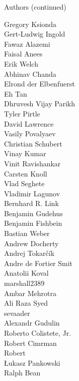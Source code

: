 \documentclass[xcolor=svgnames]{beamer}
\begin{document}
\begin{frame}{Authors (continued)}
  \begin{multicols}{5}
    \tiny

        Gregory Ksionda\\
        Gert-Ludwig Ingold\\
        Fawaz Alazemi\\
        Faisal Anees\\
        Erik Welch\\
        Abhinav Chanda\\
        Elrond der Elbenfuerst\\
        Eh Tan\\
        Dhruvesh Vijay Parikh\\
        Tyler Pirtle\\
        David Lawrence\\
        Vasily Povalyaev\\
        Christian Schubert\\
        Vinay Kumar\\
        Vinit Ravishankar\\
        Carsten Knoll\\
        Vlad Seghete\\
        Vladimir Lagunov\\
        Bernhard R. Link\\
        Benjamin Gudehus\\
        Benjamin Fishbein\\
        Bastian Weber\\
        Andrew Docherty\\
        Andrej Tokarčík\\
        Andre de Fortier Smit\\
        Anatolii Koval\\
        marshall2389\\
        Ambar Mehrotra\\
        Ali Raza Syed\\
        sevaader\\
        Alexandr Gudulin\\
        Roberto Colistete, Jr.\\
        Robert Cimrman\\
        Robert\\
        Łukasz Pankowski\\
        Ralph Bean\\
  \end{multicols}
\end{frame}
\end{document}
